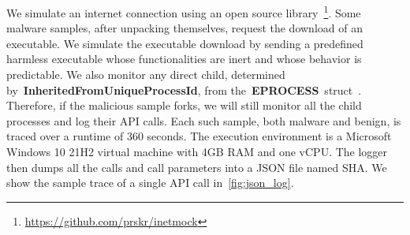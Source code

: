We simulate an internet connection using an open source library~\footnote{\url{https://github.com/prskr/inetmock}}.
Some malware samples, after unpacking themselves, request the download of an executable. We simulate the executable download by sending a predefined harmless executable whose functionalities are inert and whose behavior is predictable.
We also monitor any direct child, determined by~\textbf{InheritedFromUniqueProcessId}, from the~\textbf{EPROCESS}~struct~\cite{eprocess}.
Therefore, if the malicious sample forks, we will still monitor all the child processes and log their API calls.
Each such sample, both malware and benign, is traced over a runtime of $360$ seconds.
The execution environment is a Microsoft Windows 10 21H2 virtual machine with 4GB RAM and one vCPU.
The logger then dumps all the calls and call parameters into a JSON file named SHA.
We show the sample trace of a single API call in~\autoref{fig:json_log}.

\iffalse
